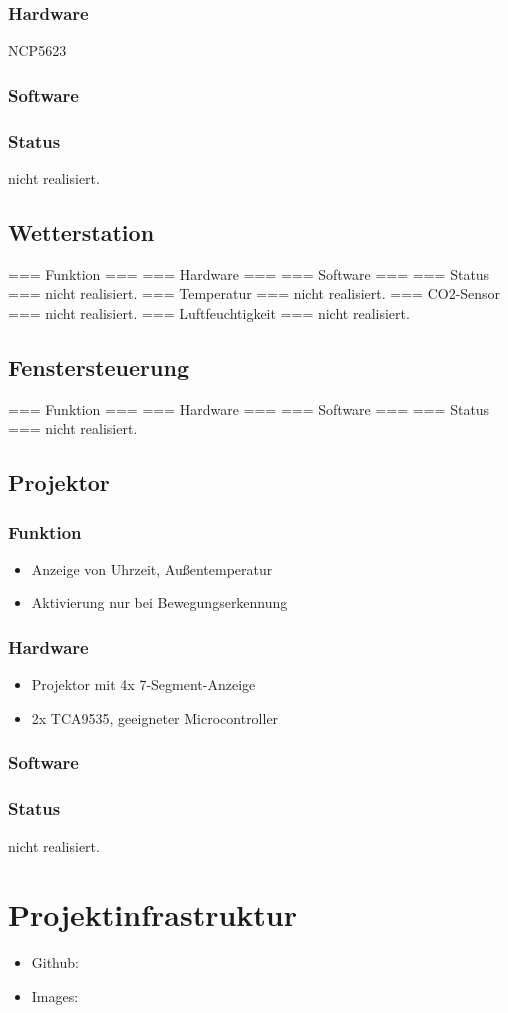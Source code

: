 \documentclass[a4paper,twoside,titlepage,normalheadings,tocleft,bibtotoc]{scrartcl}
\begin{document}
\subsubsection{Hardware}
NCP5623
\subsubsection{Software}
\subsubsection{Status}
nicht realisiert.

\subsection{Wetterstation}
=== Funktion ===
=== Hardware ===
=== Software ===
=== Status ===
nicht realisiert.
=== Temperatur ===
nicht realisiert.
=== CO2-Sensor ===
nicht realisiert.
=== Luftfeuchtigkeit ===
nicht realisiert.

\subsection{Fenstersteuerung}
=== Funktion ===
=== Hardware ===
=== Software ===
=== Status ===
nicht realisiert.

\subsection{Projektor}
\subsubsection{Funktion}
\begin{itemize}
\item Anzeige von Uhrzeit, Außentemperatur
\item Aktivierung nur bei Bewegungserkennung
\end{itemize}

\subsubsection{Hardware}
\begin{itemize}
\item Projektor mit 4x 7-Segment-Anzeige
\item 2x TCA9535, geeigneter Microcontroller
\end{itemize}
\subsubsection{Software}
\subsubsection{Status}
nicht realisiert.

\section{Projektinfrastruktur}
\begin{itemize}
\item Github:  
\item Images:
\end{itemize}
\end{document}
